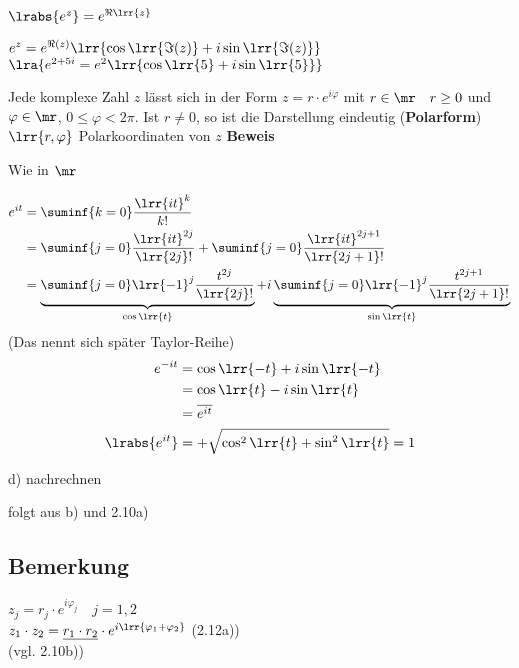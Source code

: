 		\item $\lrabs{e^z}=e^{\Re\lrr{z}}$
		\item $e^z=e^{\Re(z)}\lrr{\cos\lrr{\Im(z)}+i\sin\lrr{\Im(z)}}$\\
			$\lra{e^{2+5i}=e^2\lrr{\cos\lrr{5}+i\sin\lrr{5}}}$
		\item Jede komplexe Zahl $z$ lässt sich in der Form $z=r\cdot e^{i\varphi}$ mit $r\in\mr\quad r\geq 0$ und $\varphi\in\mr$, $0\leq\varphi <2\pi$. Ist $r\neq 0$, so ist die Darstellung eindeutig (\textbf{Polarform})\\
			$\lrr{r,\varphi}$ Polarkoordinaten von $z$
	\subExEnd
	\textbf{Beweis}
		\item Wie in $\mr$
		\item 
			\begin{align*}
				e^{it}&=\suminf{k=0}\frac{\lrr{it}^k}{k!}\\
				&=\suminf{j=0}\frac{\lrr{it}^{2j}}{\lrr{2j}!}+\suminf{j=0}\frac{\lrr{it}^{2j+1}}{\lrr{2j+1}!}\\
				&=\underbrace{\suminf{j=0}\lrr{-1}^j\frac{t^{2j}}{\lrr{2j}!}}_{\cos\lrr{t}}+i\underbrace{\suminf{j=0}\lrr{-1}^j\frac{t^{2j+1}}{\lrr{2j+1}!}}_{\sin\lrr{t}}
			\end{align*}
			(Das nennt sich später Taylor-Reihe)
			\begin{align*}
				e^{-it}&=\cos\lrr{-t}+i\sin\lrr{-t}\\
				&=\cos\lrr{t}-i\sin\lrr{t}\\
				&=\overline{e^{it}}\\
				\lrabs{e^{it}}&=+\sqrt{\cos^2\lrr{t}+\sin^2\lrr{t}}=1
			\end{align*}
		\item d) nachrechnen
		\item folgt aus b) und 2.10a)
	\subExEnd

\subsection{Bemerkung}
	$z_j=r_j\cdot e^{i\varphi_j}\quad j=1,2$\\
	$z_1\cdot z_2=\underline{r_1\cdot r_2}\cdot e^{i\lrr{\varphi_1+\varphi_2}}$ (2.12a))\\
	(vgl. 2.10b))

